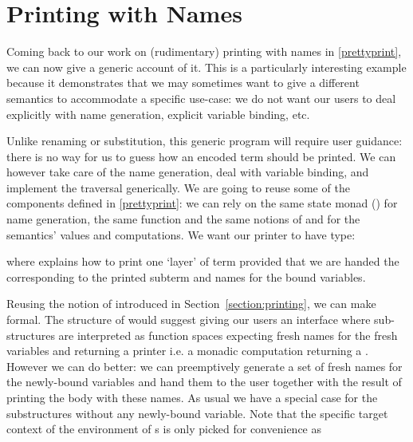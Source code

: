 \section{Printing with Names}\label{section:genericprinting}

Coming back to our work on (rudimentary) printing with names in
\cref{prettyprint}, we can now give a generic account of it. This is a
particularly interesting example because it demonstrates that we may
sometimes want to give  a different semantics to accommodate
a specific use-case: we do not want our users to deal explicitly with
name generation, explicit variable binding, etc.

Unlike renaming or substitution, this generic program will require user
guidance: there is no way for us to guess how an encoded term should be
printed. We can however take care of the name generation, deal with variable
binding, and implement the traversal generically. We are going to reuse
some of the components defined in \cref{prettyprint}: we can rely on the
same state monad () for name generation, the same 
function and the same notions of  and  for the
semantics' values and computations.
%
We want our printer to have type:
\begin{agdasnippet}
\end{agdasnippet}
%
where  explains how to print one `layer' of term provided that
we are handed the  corresponding to the printed subterm and
names for the bound variables.
%
\begin{agdasnippet}
\end{agdasnippet}
%
Reusing the notion of  introduced in Section~\ref{section:printing},
we can make  formal.
%
The structure of  would suggest giving our users an interface
where sub-structures are interpreted as  function spaces expecting
fresh names for the fresh variables and returning a printer i.e. a monadic
computation returning a . However we can do better: we can
preemptively generate a set of fresh names for the newly-bound variables and
hand them to the user together with the result of printing the body with
these names. As usual we have a special case for the substructures without
any newly-bound variable. Note that the specific target context of the
environment of s is only picked for convenience as 
